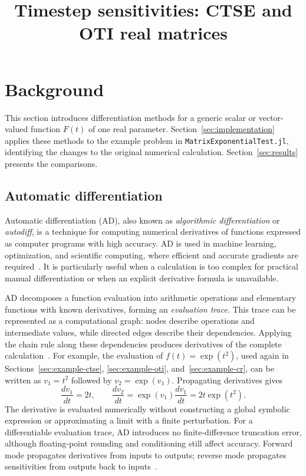 \documentclass[10pt]{article}
\title{Timestep sensitivities: CTSE and OTI real matrices}
\author{}
\date{}
\begin{document}
\maketitle
\vspace{-2em}
\setcounter{tocdepth}{3}
\begingroup\hypersetup{linkcolor=black}
\tableofcontents
\endgroup
\clearpage
\section{Background}
\label{sec:background}
This section introduces differentiation methods for a generic scalar or
vector-valued function $F(t)$ of one real parameter. Section~\ref{sec:implementation}
applies these methods to the example problem in
\texttt{MatrixExponentialTest.jl}, identifying the changes to the original
numerical calculation. Section~\ref{sec:results} presents the comparisons.

\subsection{Automatic differentiation}
\label{sec:introduction}
Automatic differentiation (AD), also known as \emph{algorithmic differentiation}
or \emph{autodiff}, is a technique for computing numerical derivatives of
functions expressed as computer programs with high accuracy. AD is used in
machine learning, optimization, and scientific computing, where efficient and
accurate gradients are required~\cite{ADinML,AD-App}. It is particularly useful
when a calculation is too complex for practical manual differentiation or when
an explicit derivative formula is unavailable.

AD decomposes a function evaluation into arithmetic operations and elementary
functions with known derivatives, forming an \emph{evaluation trace}. This trace
can be represented as a computational graph: nodes describe operations and
intermediate values, while directed edges describe their dependencies. Applying
the chain rule along these dependencies produces derivatives of the complete
calculation~\cite{eval_deriv_ad}. For example, the evaluation of $f(t)=\exp(t^2)$,
used again in Sections~\ref{sec:example-ctse}, \ref{sec:example-oti},
and~\ref{sec:example-cr}, can be written as $v_1=t^2$ followed by
$v_2=\exp(v_1)$. Propagating derivatives gives
\[
 \frac{dv_1}{dt}=2t,\qquad
 \frac{dv_2}{dt}=\exp(v_1)\frac{dv_1}{dt}=2t\exp(t^2).
\]
The derivative is evaluated numerically without constructing a global symbolic
expression or approximating a limit with a finite perturbation. For a
differentiable evaluation trace, AD introduces no finite-difference truncation
error, although floating-point rounding and conditioning still affect accuracy.
Forward mode propagates derivatives from inputs to outputs; reverse mode
propagates sensitivities from outputs back to inputs~\cite{eval_deriv_ad}.
\end{document}
